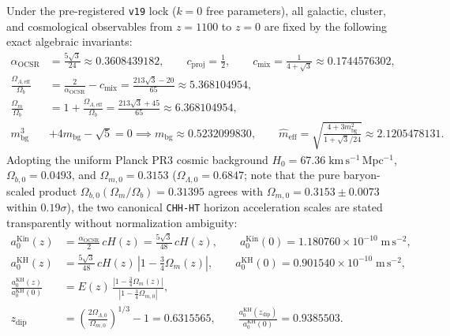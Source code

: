 \documentclass[11pt,a4paper]{article}
\begin{document}
Under the pre-registered \texttt{v19} lock ($k = 0$ free parameters), all galactic, cluster, and cosmological observables from $z = 1100$ to $z = 0$ are fixed by the following exact algebraic invariants:
\begin{align}
  \alpha_{\mathrm{OCSR}} &= \frac{5\sqrt{3}}{24} \approx 0.3608439182, \qquad c_{\mathrm{proj}} = \frac{1}{2}, \qquad c_{\mathrm{mix}} = \frac{1}{4 + \sqrt{3}} \approx 0.1744576302, \label{eq:alpha_ocsr} \\
  \frac{\Omega_{A,\mathrm{eff}}}{\Omega_b} &= \frac{2}{\alpha_{\mathrm{OCSR}}} - c_{\mathrm{mix}} = \frac{213\sqrt{3} - 20}{65} \approx 5.368104954, \label{eq:omega_a_ratio} \\
  \frac{\Omega_m}{\Omega_b} &= 1 + \frac{\Omega_{A,\mathrm{eff}}}{\Omega_b} = \frac{213\sqrt{3} + 45}{65} \approx 6.368104954, \label{eq:omega_ratio} \\
  m_{\mathrm{bg}}^3 &+ 4 m_{\mathrm{bg}} - \sqrt{5} = 0 \implies m_{\mathrm{bg}} \approx 0.5232099830, \qquad
  \hat{m}_{\mathrm{eff}} = \sqrt{\frac{4 + 3 m_{\mathrm{bg}}^2}{1 + \sqrt{3}/24}} \approx 2.1205478131. \label{eq:m_eff_coca}
\end{align}
Adopting the uniform Planck PR3 cosmic background $H_0 = 67.36\;\mathrm{km\,s^{-1}\,Mpc^{-1}}$, $\Omega_{b,0} = 0.0493$, and $\Omega_{m,0} = 0.3153$ ($\Omega_{\Lambda,0} = 0.6847$; note that the pure baryon-scaled product $\Omega_{b,0}(\Omega_m/\Omega_b) = 0.31395$ agrees with $\Omega_{m,0} = 0.3153 \pm 0.0073$ within $0.19\sigma$), the two canonical \texttt{CHH-HT} horizon acceleration scales are stated transparently without normalization ambiguity:
\begin{align}
  a_0^{\mathrm{Kin}}(z) &= \frac{\alpha_{\mathrm{OCSR}}}{2}\,c H(z) = \frac{5\sqrt{3}}{48}\,c H(z), \qquad
  a_0^{\mathrm{Kin}}(0) = 1.180760 \times 10^{-10}\;\mathrm{m\,s^{-2}}, \label{eq:a0_kin} \\
  a_0^{\mathrm{KH}}(z) &= \frac{5\sqrt{3}}{48}\,c H(z)\,\left|1 - \frac{3}{4}\Omega_m(z)\right|, \qquad
  a_0^{\mathrm{KH}}(0) = 0.901540 \times 10^{-10}\;\mathrm{m\,s^{-2}}, \label{eq:a0_kh} \\
  \frac{a_0^{\mathrm{KH}}(z)}{a_0^{\mathrm{KH}}(0)} &= E(z)\,\frac{\left|1 - \frac{3}{4}\Omega_m(z)\right|}{\left|1 - \frac{3}{4}\Omega_{m,0}\right|}, \label{eq:kh_norm} \\
  z_{\mathrm{dip}} &= \left(\frac{2\Omega_{\Lambda,0}}{\Omega_{m,0}}\right)^{1/3} - 1 = 0.6315565, \qquad
  \frac{a_0^{\mathrm{KH}}(z_{\mathrm{dip}})}{a_0^{\mathrm{KH}}(0)} = 0.9385503. \label{eq:zdip}
\end{align}
\end{document}
